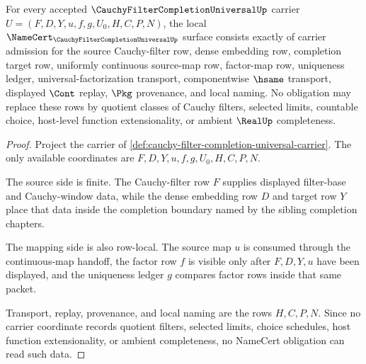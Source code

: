 \begin{theorem}
\label{thm:cauchy-filter-completion-universal-namecert-obligations}
For every accepted $\CauchyFilterCompletionUniversalUp$ carrier $U=(F,D,Y,u,f,g,U_0,H,C,P,N)$, the local $\NameCert_{\CauchyFilterCompletionUniversalUp}$ surface consists exactly of carrier admission for the source Cauchy-filter row, dense embedding row, completion target row, uniformly continuous source-map row, factor-map row, uniqueness ledger, universal-factorization transport, componentwise $\hsame$ transport, displayed $\Cont$ replay, $\Pkg$ provenance, and local naming. No obligation may replace these rows by quotient classes of Cauchy filters, selected limits, countable choice, host-level function extensionality, or ambient $\RealUp$ completeness.
\end{theorem}
\begin{proof}
Project the carrier of \autoref{def:cauchy-filter-completion-universal-carrier}. The only available coordinates are $F,D,Y,u,f,g,U_0,H,C,P,N$.

The source side is finite. The Cauchy-filter row $F$ supplies displayed filter-base and Cauchy-window data, while the dense embedding row $D$ and target row $Y$ place that data inside the completion boundary named by the sibling completion chapters.

The mapping side is also row-local. The source map $u$ is consumed through the continuous-map handoff, the factor row $f$ is visible only after $F,D,Y,u$ have been displayed, and the uniqueness ledger $g$ compares factor rows inside that same packet.

Transport, replay, provenance, and local naming are the rows $H,C,P,N$. Since no carrier coordinate records quotient filters, selected limits, choice schedules, host function extensionality, or ambient completeness, no NameCert obligation can read such data.
\end{proof}

